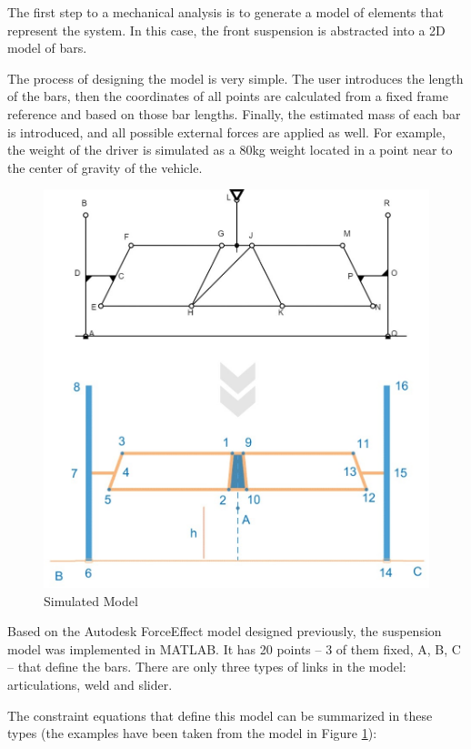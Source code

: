 The first step to a mechanical analysis is to generate a model of elements that represent the system. In this case, the front suspension is abstracted into a 2D model of bars. 

The process of designing the model is very simple. The user introduces the length of the bars, then the coordinates of all points are calculated from a fixed frame reference and based on those bar lengths. Finally, the estimated mass of each bar is introduced, and all possible external forces are applied as well. For example, the weight of the driver is simulated as a 80kg weight located in a point near to the center of gravity of the vehicle.

\begin{figure}
	\includegraphics[width=1.0\linewidth]{figs/05/sim/1}
	\caption{Simulated Model}
	\label{model_schematic}
\end{figure}

Based on the Autodesk ForceEffect model designed previously, the suspension model was implemented in MATLAB. It has 20 points -- 3 of them fixed, A, B, C -- that define the bars. There are only three types of links in the model: articulations, weld and slider. 

The constraint equations that define this model can be summarized in these types (the examples have been taken from the model in Figure \ref{model_schematic}):

